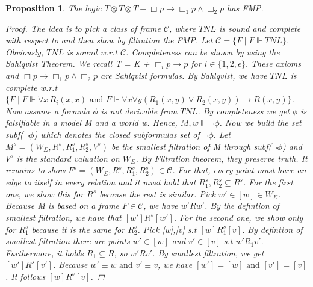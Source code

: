 \documentclass[12pt, a4paper]{scrartcl}
\newtheorem{proposition}[definition]{Proposition}
\begin{document}
\begin{proposition}
    The logic $T \otimes T \otimes T + \Box p \rightarrow \Box_1 p \land \Box_2 p$ has FMP.
    \begin{proof}
    The idea is to pick a class of frame $\mathcal{C}$, where $\mathit{TNL}$ is sound and complete with respect to and then show by filtration the FMP. \newline \newline
    Let $\mathcal{C} = \{F \mid F \Vdash \mathit{TNL}\}$. Obviously,  $\mathit{TNL}$ is sound w.r.t $\mathcal{C}$. Completeness can be shown by using the Sahlqvist Theorem.
    We recall T = K + $\Box_i p \rightarrow p$ for $i \in \{1,2, \epsilon\}$. These axioms and $\Box p \rightarrow \Box_1 p \land \Box_2 p$ are Sahlqvist formulas. 
    By Sahlqvist, we have $\mathit{TNL}$ is complete w.r.t $\{F \mid F \Vdash \forall x \, R_i(x,x) \mbox{ and } F \Vdash \forall x \forall y (R_1(x,y) \lor R_2(x,y)) \rightarrow R(x,y)\}$. \newline \newline
    Now assume a formula $\phi$ is not derivable from $\mathit{TNL}$. By completeness we get $\phi$ is falsifiable in a model M and a world w. Hence, $M,w \Vdash \neg \phi$. Now we build the set subf($\neg \phi$) which denotes the closed subformulas set of $\neg \phi$.
    Let $M^s = (W_\Sigma, R^s, R^s_1, R^s_2, V^s)$ be the smallest filtration of M through subf($\neg \phi$) and $V^s$ is the standard valuation on $W_\Sigma$. By Filtration theorem, they preserve truth.
    It remains to show $F^s = (W_\Sigma, R^s, R^s_1, R^s_2)\in  \mathcal{C}$. For that, every point must have an edge to itself in every relation and it must hold that $R^s_1,R^s_2 \subseteq R^s$. For the first one, we show this for $R^s$ because the rest is similar.
    Pick $w' \in [w]\in W_\Sigma$. Because M is based on a frame $F \in \mathcal{C}$, we have $w'Rw'$. By the defintion of smallest filtration, we have that $[w']R^s[w']$. For the second one, we show only for $R^s_1$ because it is the same for $R^s_2$.
    Pick [w],[v] s.t $[w]R^s_1[v]$. By defintion of smallest filtration there are points $w' \in [w]$ and $v' \in [v]$ s.t $w'R_1v'$. Furthermore, it holds $R_1 \subseteq R$, so $w'Rv'$.
    By smallest filtration, we get $[w']R^s[v']$. Because $w' \equiv w \mbox{ and } v' \equiv v$, we have $[w'] = [w] \mbox{ and } [v'] = [v]$. It follows $[w]R^s[v]$.
    
    \end{proof}
        
\end{proposition}
\end{document}
